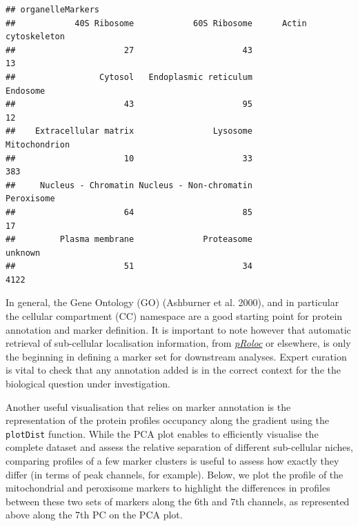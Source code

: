 \begin{Shaded}
\begin{Highlighting}[]
\StringTok{ } \NormalTok{, } \NormalTok{)}
\end{Highlighting}
\end{Shaded}

\begin{verbatim}
## organelleMarkers
##            40S Ribosome            60S Ribosome      Actin cytoskeleton 
##                      27                      43                      13 
##                 Cytosol   Endoplasmic reticulum                Endosome 
##                      43                      95                      12 
##    Extracellular matrix                Lysosome           Mitochondrion 
##                      10                      33                     383 
##     Nucleus - Chromatin Nucleus - Non-chromatin              Peroxisome 
##                      64                      85                      17 
##         Plasma membrane              Proteasome                 unknown 
##                      51                      34                    4122
\end{verbatim}

In general, the Gene Ontology (GO) (Ashburner et al. 2000), and in
particular the cellular compartment (CC) namespace are a good starting
point for protein annotation and marker definition. It is important to
note however that automatic retrieval of sub-cellular localisation
information, from
\emph{\href{http://bioconductor.org/packages/pRoloc}{pRoloc}} or
elsewhere, is only the beginning in defining a marker set for downstream
analyses. Expert curation is vital to check that any annotation added is
in the correct context for the the biological question under
investigation.

Another useful visualisation that relies on marker annotation is the
representation of the protein profiles occupancy along the gradient
using the \texttt{plotDist} function. While the PCA plot enables to
efficiently visualise the complete dataset and assess the relative
separation of different sub-cellular niches, comparing profiles of a few
marker clusters is useful to assess how exactly they differ (in terms of
peak channels, for example). Below, we plot the profile of the
mitochondrial and peroxisome markers to highlight the differences in
profiles between these two sets of markers along the 6th and 7th
channels, as represented above along the 7th PC on the PCA plot.

